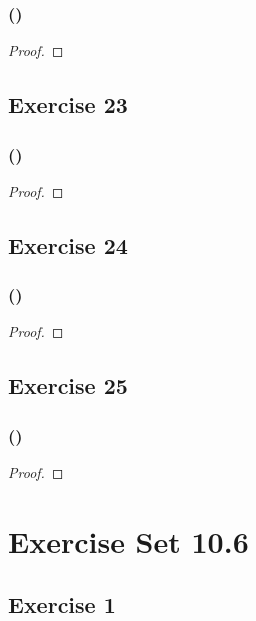 \documentclass[14pt]{extarticle}
\begin{document}
\subsubsection{()}

\begin{proof}

\end{proof}

\subsection{Exercise 23}

\subsubsection{()}

\begin{proof}

\end{proof}

\subsection{Exercise 24}

\subsubsection{()}

\begin{proof}

\end{proof}

\subsection{Exercise 25}

\subsubsection{()}

\begin{proof}

\end{proof}

\section{Exercise Set 10.6}
\subsection{Exercise 1}
\end{document}
